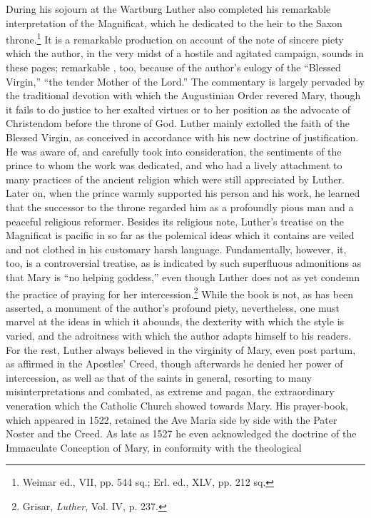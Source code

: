 During his sojourn at the Wartburg Luther also completed his
remarkable interpretation of the Magnificat, which he dedicated to
the heir to the Saxon throne.\footnote{Weimar ed., VII, pp. 544 sq.; Erl. ed., XLV, pp. 212 sq.}
It is a remarkable production on account
of the note of sincere piety which the author, in the very
midst of a hostile and agitated campaign, sounds in these pages; remarkable
, too, because of the author’s eulogy of the “Blessed Virgin,”
“the tender Mother of the Lord.” The commentary is largely
pervaded by the traditional devotion with which the Augustinian Order revered
Mary, though it fails to do justice to her exalted virtues
or to her position as the advocate of Christendom before the throne
of God. Luther mainly extolled the faith of the Blessed Virgin,
as conceived in accordance with his new doctrine of justification.
He was aware of, and carefully took into consideration, the sentiments
of the prince to whom the work was dedicated, and who had a lively
attachment to many practices of the ancient religion which were still
appreciated by Luther. Later on, when the prince warmly supported
his person and his work, he learned that the successor to the throne
regarded him as a profoundly pious man and a peaceful religious reformer.
Besides its religious note, Luther’s treatise on the Magnificat is
pacific in so far as the polemical ideas which it contains are veiled and
not clothed in his customary harsh language. Fundamentally, however,
it, too, is a controversial treatise, as is indicated by such superfluous admonitions
as that Mary is “no helping goddess,” even though Luther
does not as yet condemn the practice of praying for her intercession.\footnote
{Grisar, \textit{Luther}, Vol. IV, p. 237.}
While the book is not, as has been asserted, a monument of the
author’s profound piety, nevertheless, one must marvel at the ideas in
which it abounds, the dexterity with which the style is varied, and the
adroitness with which the author adapts himself to his readers. For
the rest, Luther always believed in the virginity of Mary, even post
partum, as affirmed in the Apostles’ Creed, though afterwards he
denied her power of intercession, as well as that of the saints in general,
resorting to many misinterpretations and combated, as extreme
and pagan, the extraordinary veneration which the Catholic Church
showed towards Mary. His prayer-book, which appeared in 1522, retained
the Ave Maria side by side with the Pater Noster and the
Creed. As late as 1527 he even acknowledged the doctrine of the Immaculate
Conception of Mary, in conformity with the theological
